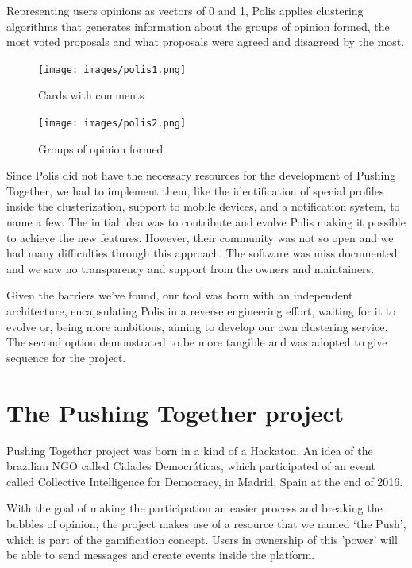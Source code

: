 \documentclass{llncs}
\begin{document}
  Representing users opinions as vectors of 0 and 1, Polis applies clustering algorithms
  that generates information about the groups of opinion formed, the most voted
  proposals and what proposals were agreed and disagreed by the most.

 \begin{figure}[H]
   \centering
   \begin{minipage}{.50\textwidth}
     \texttt{[image: images/polis1.png]}
     \caption{Cards with comments}
     \label{fig:polis-2}
   \end{minipage}
   \begin{minipage}{.49\textwidth}
     \texttt{[image: images/polis2.png]}
     \caption{Groups of opinion formed}
     \label{fig:polis-1}
   \end{minipage}
 \end{figure}

  Since Polis did not have the necessary resources for the development of
  Pushing Together, we had to implement them, like the identification of
  special profiles inside the clusterization, support to mobile devices, and a notification
  system, to name a few. The initial idea was to contribute and evolve Polis making it
  possible to achieve the new features. However, their community was not so
  open and we had many difficulties through this approach. The software was miss
  documented and we saw no transparency and support from the owners and maintainers.

  Given the barriers we’ve found, our tool was born with an independent
  architecture, encapsulating Polis in a reverse engineering effort, waiting
  for it to evolve or, being more ambitious, aiming to develop our own clustering
  service. The second option demonstrated to be more tangible and was adopted to
  give sequence for the project.

\section{The Pushing Together project}
\label{sec:pushingtogether}

  Pushing Together project was born in a kind of a Hackaton. An idea of the 
  brazilian NGO called Cidades Democráticas, which participated of an event
  called Collective Intelligence for Democracy, in Madrid, Spain at the end of
  2016.

  With the goal of making the participation an easier process and breaking the
  bubbles of opinion, the project makes use of a resource that we named ‘the Push’,
  which is part of the gamification concept. Users in ownership of this 'power'
  will be able to send messages and create events inside the platform.
\end{document}
